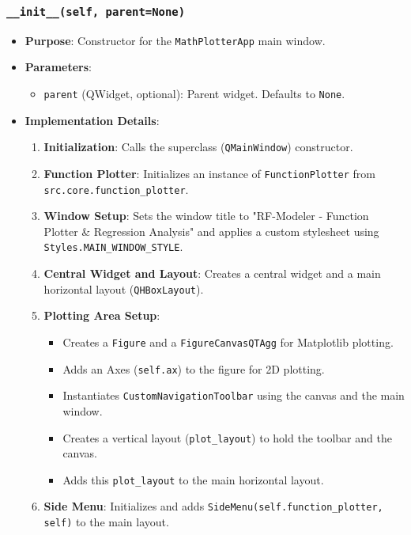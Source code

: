 \documentclass[12pt,a4paper]{report}
\begin{document}
\subsubsection{\texttt{\_\_init\_\_(self, parent=None)}}
\begin{itemize}
    \item \textbf{Purpose}: Constructor for the \texttt{MathPlotterApp} main window.
    \item \textbf{Parameters}:
        \begin{itemize}
            \item \texttt{parent} (QWidget, optional): Parent widget. Defaults to \texttt{None}.
        \end{itemize}
    \item \textbf{Implementation Details}:
        \begin{enumerate}
            \item \textbf{Initialization}: Calls the superclass (\texttt{QMainWindow}) constructor.
            \item \textbf{Function Plotter}: Initializes an instance of \texttt{FunctionPlotter} from \texttt{src.core.function\_plotter}.
            \item \textbf{Window Setup}: Sets the window title to "RF-Modeler - Function Plotter & Regression Analysis" and applies a custom stylesheet using \texttt{Styles.MAIN\_WINDOW\_STYLE}.
            \item \textbf{Central Widget and Layout}: Creates a central widget and a main horizontal layout (\texttt{QHBoxLayout}).
            \item \textbf{Plotting Area Setup}:
                \begin{itemize}
                    \item Creates a \texttt{Figure} and a \texttt{FigureCanvasQTAgg} for Matplotlib plotting.
                    \item Adds an Axes (\texttt{self.ax}) to the figure for 2D plotting.
                    \item Instantiates \texttt{CustomNavigationToolbar} using the canvas and the main window.
                    \item Creates a vertical layout (\texttt{plot\_layout}) to hold the toolbar and the canvas.
                    \item Adds this \texttt{plot\_layout} to the main horizontal layout.
                \end{itemize}
            \item \textbf{Side Menu}: Initializes and adds \texttt{SideMenu(self.function\_plotter, self)} to the main layout.

\end{enumerate}
\end{itemize}
\end{document}
